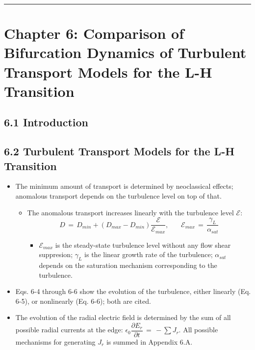 \documentclass[a4paper]{article}
\begin{document}
\begin{center}\rule{3in}{0.4pt}\end{center}

\section{Chapter 6: Comparison of Bifurcation Dynamics of Turbulent
Transport Models for the L-H
Transition}\label{chapter-6-comparison-of-bifurcation-dynamics-of-turbulent-transport-models-for-the-l-h-transition}

\subsection{6.1 Introduction}\label{introduction-3}

\subsection{6.2 Turbulent Transport Models for the L-H
Transition}\label{turbulent-transport-models-for-the-l-h-transition}

\begin{itemize}
\item
  The minimum amount of transport is determined by neoclassical effects;
  anomalous transport depends on the turbulence level on top of that.

  \begin{itemize}
  \item
    The anomalous transport increases linearly with the turbulence level
    $\mathcal{E}$:
    \[D \,=\, D_{min} + \left(D_{max} - D_{min}\right)\frac{\mathcal{E}}{\mathcal{E}_{max}}, ~~~~~~~~ \mathcal{E}_{max} \,=\, \frac{\gamma_L}{\alpha_{sat}}\]

    \begin{itemize}
    \itemsep1pt\parskip0pt
    \item
      $\mathcal{E}_{max}$ is the steady-state turbulence level without
      any flow shear suppresion; $\gamma_L$ is the linear growth rate of
      the turbulence; $\alpha_{sat}$ depends on the saturation mechanism
      corresponding to the turbulence.
    \end{itemize}
  \end{itemize}
\item
  Eqs. 6-4 through 6-6 show the evolution of the turbulence, either
  linearly (Eq. 6-5), or nonlinearly (Eq. 6-6); both are cited.
\item
  The evolution of the radial electric field is determined by the sum of
  all possible radial currents at the edge:
  $\epsilon_0 \dfrac{\partial E_r}{\partial t} \,=\, -\sum J_r$. All
  possible mechanisms for generating $J_r$ is summed in Appendix 6.A.
\end{itemize}
\end{document}
